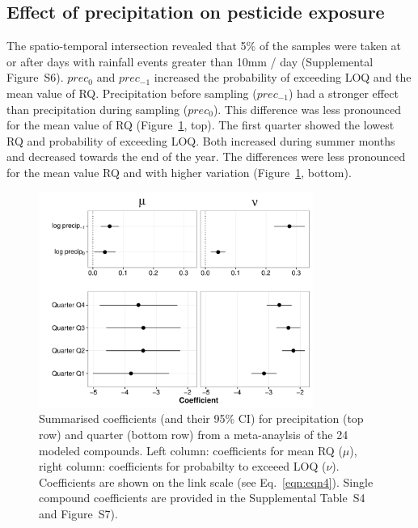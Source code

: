 \documentclass[journal=esthag,manuscript=article]{achemso}
\begin{document}
\subsection{Effect of precipitation on pesticide exposure}
The spatio-temporal intersection revealed that 5\% of the samples were taken at or after days with rainfall events greater than 10mm / day (Supplemental Figure~S6).
$prec_{0}$ and $prec_{-1}$ increased the probability of exceeding LOQ and the mean value of RQ.
Precipitation before sampling ($prec_{-1}$) had a stronger effect than precipitation during sampling ($prec_{0}$). 
This difference was less pronounced for the mean value of RQ (Figure~\ref{fig:fig5}, top).
The first quarter showed the lowest RQ and probability of exceeding LOQ.
Both increased during summer months and decreased towards the end of the year.
The differences were less pronounced for the mean value RQ and with higher variation (Figure~\ref{fig:fig5}, bottom).


\begin{figure}[ht]
  \includegraphics[width=0.8\textwidth]{figure5.pdf}
  \caption{Summarised coefficients (and their 95\% CI) for precipitation (top row) and quarter (bottom row) from a meta-anaylsis of the 24 modeled compounds. Left column: coefficients for mean RQ ($\mu$), right column: coefficients for probabilty to exceeed LOQ ($\nu$). 
  Coefficients are shown on the link scale (see Eq.~\ref{eqn:eqn4}).
  Single compound coefficients are provided in the Supplemental Table~S4 and Figure~S7).
  }
  \label{fig:fig5}
\end{figure}
\end{document}
